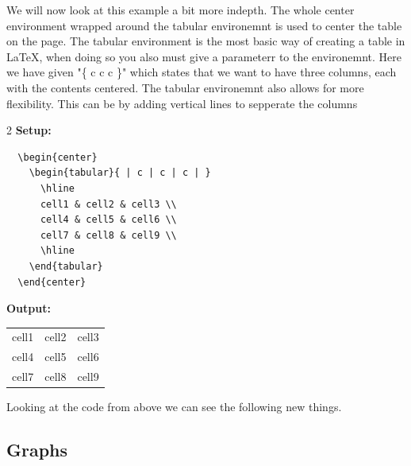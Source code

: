 \documentclass{article}
\begin{document}
We will now look at this example a bit more indepth. The whole center environment wrapped around the tabular environemnt is used to center the table on the page. The tabular environment is the most basic way of creating a table in \LaTeX, when doing so you also must give a parameterr to the environemnt. Here we have given "\{ c c c \}" which states that we want to have three columns, each with the contents centered.
The tabular environemnt also allows for more flexibility. This can be by adding vertical lines to sepperate the columns 

\begin{multicols}{2}
  \textbf{Setup:}
  \begin{lstlisting}
  \begin{center}
    \begin{tabular}{ | c | c | c | }
      \hline
      cell1 & cell2 & cell3 \\
      cell4 & cell5 & cell6 \\
      cell7 & cell8 & cell9 \\
      \hline
    \end{tabular}
  \end{center}
  \end{lstlisting}
  \columnbreak

  \textbf{Output:}
  \begin{center}
    \begin{tabular}{ | c | c | c | }
      \hline
      cell1 & cell2 & cell3 \\
      cell4 & cell5 & cell6 \\
      cell7 & cell8 & cell9 \\
      \hline
    \end{tabular}
  \end{center}
\end{multicols}

Looking at the code from above we can see the following new things.

\subsection{Graphs}
\newpage

\end{document}
